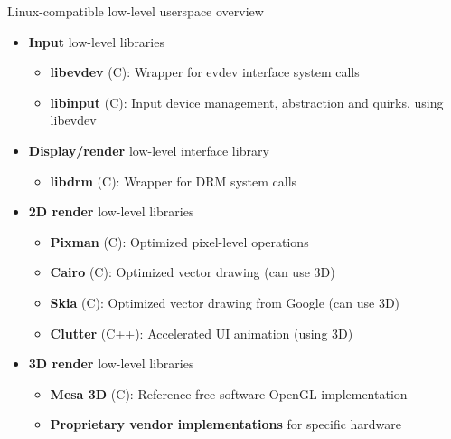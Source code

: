 \begin{frame}{Linux-compatible low-level userspace overview}
  \begin{itemize}
  \item \textbf{Input} low-level libraries
    \begin{itemize}
    \item \textbf{libevdev} (C): Wrapper for evdev interface system calls
    \item \textbf{libinput} (C): Input device management, abstraction and quirks, using libevdev
    \end{itemize}
  \item \textbf{Display/render} low-level interface library
    \begin{itemize}
    \item \textbf{libdrm} (C): Wrapper for DRM system calls
    \end{itemize}
  \item \textbf{2D render} low-level libraries
    \begin{itemize}
    \item \textbf{Pixman} (C): Optimized pixel-level operations
    \item \textbf{Cairo} (C): Optimized vector drawing (can use 3D)
    \item \textbf{Skia} (C): Optimized vector drawing from Google (can use 3D)
    \item \textbf{Clutter} (C++): Accelerated UI animation (using 3D)
    \end{itemize}
  \item \textbf{3D render} low-level libraries
    \begin{itemize}
    \item \textbf{Mesa 3D} (C): Reference free software OpenGL implementation
    \item \textbf{Proprietary vendor implementations} for specific hardware
    \end{itemize}
  \end{itemize}
\end{frame}

